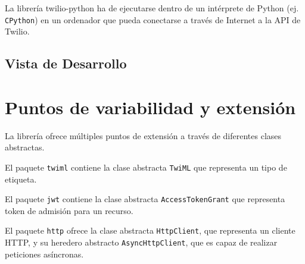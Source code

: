 \documentclass{article}
\begin{document}
\begin{center}
\label{fig:vista de despliegue}
\end{center}

\hfill

La librería twilio-python ha de ejecutarse
dentro de un intérprete de Python (ej. \verb|CPython|)
en un ordenador que pueda conectarse a través de Internet
a la API de Twilio.

\subsection{Vista de Desarrollo}


\section{Puntos de variabilidad y extensión}

La librería ofrece múltiples puntos de extensión
a través de diferentes clases abstractas.

El paquete \verb|twiml| contiene la clase abstracta \verb|TwiML|
que representa un tipo de etiqueta.

El paquete \verb|jwt| contiene la clase abstracta \verb|AccessTokenGrant|
que representa token de admisión para un recurso.

El paquete \verb|http| ofrece la clase abstracta
\verb|HttpClient|, que representa un cliente HTTP,
y su heredero abstracto \verb|AsyncHttpClient|,
que es capaz de realizar peticiones asíncronas.
\end{document}
